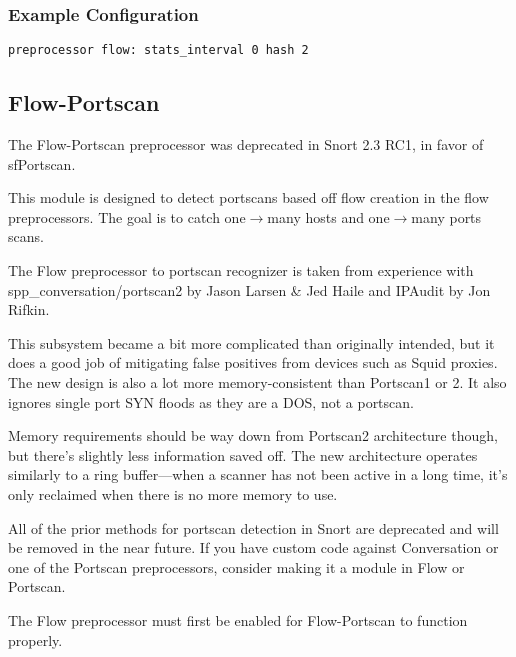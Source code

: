 \documentclass[english]{report}
\newenvironment{note}{
\samepage
    \vspace{10pt}{\textsf{
        {\hspace{7pt}\Huge{$\triangle$\hspace{-12.5pt}{\Large{$^!$}}}}\hspace{5pt}
        {\Large{NOTE}}
    }
    }
   \begin{center}
    \par\vspace{-17pt}

    \begin{lrbox}{\savepar}
    \begin{minipage}[r]{6in}
}
{
    \end{minipage}
    \end{lrbox}
    \fbox{
        \usebox{
            \savepar
        }
    }
    \par\vskip10pt
    \end{center}
}
\begin{document}
\subsubsection{Example Configuration}

\begin{verbatim}
preprocessor flow: stats_interval 0 hash 2
\end{verbatim}




\subsection{Flow-Portscan\label{sub:flow-portscan}}

\begin{note}
The Flow-Portscan preprocessor was deprecated in Snort 2.3 RC1, in
favor of sfPortscan.
\end{note}

This module is designed to detect portscans based off flow creation in the
flow preprocessors.  The goal is to catch one$\rightarrow$many hosts and one$\rightarrow$many ports
scans.

The Flow preprocessor to portscan recognizer is taken from experience with
spp\_conversation/portscan2 by Jason Larsen \& Jed Haile and IPAudit by Jon
Rifkin.

This subsystem became a bit more complicated than originally intended, but it
does a good job of mitigating false positives from devices such as Squid
proxies.  The new design is also a lot more memory-consistent than Portscan1 or
2.  It also ignores single port SYN floods as they are a DOS, not a portscan.

Memory requirements should be way down from Portscan2 architecture though, but
there's slightly less information saved off.  The new architecture operates
similarly to a ring buffer---when a scanner has not been active in a long time,
it's only reclaimed when there is no more memory to use.

All of the prior methods for portscan detection in Snort are deprecated and
will be removed in the near future.  If you have custom code against
Conversation or one of the Portscan preprocessors, consider making it a module
in Flow or Portscan.

The Flow preprocessor must first be enabled for Flow-Portscan to
function properly.
\end{document}
